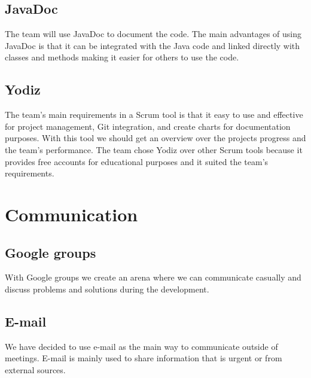 \subsection{JavaDoc}
The team will use JavaDoc to document the code. The main advantages of using JavaDoc is that it can be 
integrated with the Java code and linked directly with classes and methods making it easier for others to
use the code.

\subsection{Yodiz}
The team's main requirements in a Scrum tool is that it easy to use and effective for project management, 
Git integration, and create charts for documentation purposes. With this tool we should get an overview over 
the projects progress and the team's performance. The team chose Yodiz over other Scrum tools because it provides 
free accounts for educational purposes and it suited the team's requirements. 

\section{Communication}
\subsection{Google groups}
With Google groups we create an arena where we can communicate casually and discuss problems and solutions during 
the development.

\subsection{E-mail}
We have decided to use e-mail as the main way to communicate outside of meetings. E-mail is mainly used to 
share information that is urgent or from external sources.


